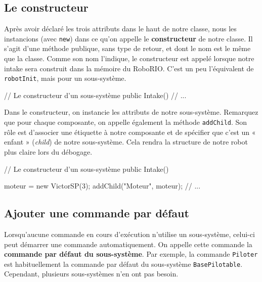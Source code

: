 \documentclass[12pt]{report}
\begin{document}
\subsection{Le constructeur}

Après avoir déclaré les trois attributs dans le haut de notre classe, nous les instancions (avec \texttt{new}) dans ce qu'on appelle le \textbf{constructeur} de notre classe. Il s'agit d'une méthode publique, sans type de retour, et dont le nom est le même que la classe. Comme son nom l'indique, le constructeur est appelé lorsque notre intake sera construit dans la mémoire du RoboRIO. C'est un peu l'équivalent de \texttt{robotInit}, mais pour un sous-système. 

\begin{code}
// Le constructeur d'un sous-système
public Intake() {
	// ...
}
\end{code}


Dans le constructeur, on instancie les attributs de notre sous-système. Remarquez que pour chaque composante, on appelle également la méthode \texttt{addChild}. Son rôle est d'associer une étiquette à notre composante et de spécifier que c'est un « enfant » (\textit{child}) de notre sous-système. Cela rendra la structure de notre robot plus claire lors du débogage.

\begin{code}
// Le constructeur d'un sous-système
public Intake() {
	
	moteur = new VictorSP(3);
	addChild("Moteur", moteur);	
	// ...
}
\end{code}

\subsection{Ajouter une commande par défaut}
Lorsqu'aucune commande en cours d'exécution n'utilise un sous-système, celui-ci peut démarrer une commande automatiquement. On appelle cette commande la \textbf{commande par défaut du sous-système}. Par exemple, la commande \texttt{Piloter} est habituellement la commande par défaut du sous-système \texttt{BasePilotable}. Cependant, plusieurs sous-systèmes n'en ont pas besoin.
\end{document}
